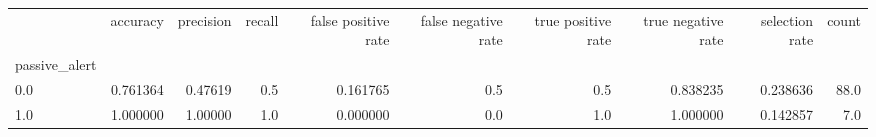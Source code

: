 \begin{tabular}{lrrrrrrrrr}
\toprule
{} &  accuracy &  precision &  recall &  false positive rate &  false negative rate &  true positive rate &  true negative rate &  selection rate &  count \\
passive\_alert &           &            &         &                      &                      &                     &                     &                 &        \\
\midrule
0.0           &  0.761364 &    0.47619 &     0.5 &             0.161765 &                  0.5 &                 0.5 &            0.838235 &        0.238636 &   88.0 \\
1.0           &  1.000000 &    1.00000 &     1.0 &             0.000000 &                  0.0 &                 1.0 &            1.000000 &        0.142857 &    7.0 \\
\bottomrule
\end{tabular}
